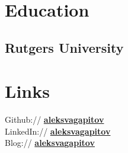 \documentclass[]{Resume}
\begin{document}
\begin{minipage}[t]{0.33\textwidth} 


\section{Education} 

\subsection{Rutgers University}
\sectionsep



\section{Links} 
Github:// \href{https://github.com/aleksvagapitov}{\bf aleksvagapitov} \\
LinkedIn://  \href{https://www.linkedin.com/in/aleksvagapitov}{\bf aleksvagapitov} \\
Blog://  \href{https://aleksvagapitov.github.io}{\bf aleksvagapitov}


%


\end{minipage}
\end{document}
